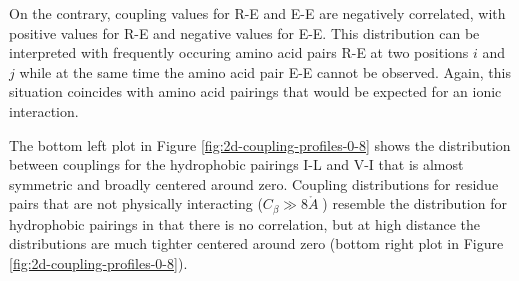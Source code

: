 \documentclass[12pt,a4paper,twoside]{book}
\newcommand{\Cb}{C_\beta}
\newcommand{\angstrom}{\mathring{A} \;}
\theoremstyle{definition}
\theoremstyle{definition}
\theoremstyle{remark}
\begin{document}
On the contrary, coupling values for R-E and E-E are negatively
correlated, with positive values for R-E and negative values for E-E.
This distribution can be interpreted with frequently occuring amino acid
pairs R-E at two positions \(i\) and \(j\) while at the same time the
amino acid pair E-E cannot be observed. Again, this situation coincides
with amino acid pairings that would be expected for an ionic
interaction.

The bottom left plot in Figure \ref{fig:2d-coupling-profiles-0-8} shows
the distribution between couplings for the hydrophobic pairings I-L and
V-I that is almost symmetric and broadly centered around zero. Coupling
distributions for residue pairs that are not physically interacting
(\(\Cb \gg 8 \angstrom\)) resemble the distribution for hydrophobic
pairings in that there is no correlation, but at high distance the
distributions are much tighter centered around zero (bottom right plot
in Figure \ref{fig:2d-coupling-profiles-0-8}).
\end{document}
